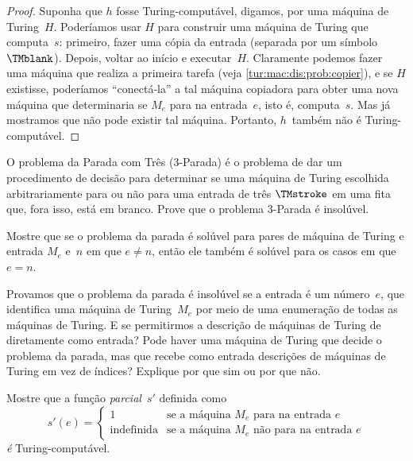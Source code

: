 \documentclass[../../../include/open-logic-section]{subfiles}
\begin{document}
\begin{proof}
Suponha que $h$ fosse Turing-computável, digamos, por uma máquina de
Turing~$H$. Poderíamos usar $H$ para construir uma máquina de Turing
que computa~$s$: primeiro, fazer uma cópia da entrada (separada por um
símbolo~$\TMblank$). Depois, voltar ao início e executar~$H$.
Claramente podemos fazer uma máquina que realiza a primeira tarefa
(veja \cref{tur:mac:dis:prob:copier}), e se $H$ existisse, poderíamos
``conectá-la'' a tal máquina copiadora para obter uma nova máquina que
determinaria se $M_e$ para na entrada~$e$, isto é, computa~$s$. Mas já
mostramos que não pode existir tal máquina. Portanto, $h$~também não é
Turing-computável.
\end{proof}

\begin{prob}
O problema da Parada com Três (3-Parada) é o problema de dar um
procedimento de decisão para determinar se uma máquina de Turing
escolhida arbitrariamente para ou não para uma entrada de três
$\TMstroke$ em uma fita que, fora isso, está em branco. Prove que o
problema 3-Parada é insolúvel.
\end{prob}

\begin{prob}
Mostre que se o problema da parada é solúvel para pares de máquina de
Turing e entrada $M_e$ e~$n$ em que $e \neq n$, então ele também é
solúvel para os casos em que $e = n$.
\end{prob}

\begin{prob}
Provamos que o problema da parada é insolúvel se a entrada é um
número~$e$, que identifica uma máquina de Turing~$M_e$ por meio de uma
enumeração de todas as máquinas de Turing. E se permitirmos a
descrição de máquinas de Turing de 
diretamente como entrada? Pode haver uma máquina de Turing que decide
o problema da parada, mas que recebe como entrada descrições de
máquinas de Turing em vez de índices? Explique por que sim ou por que
não.
\end{prob}

\begin{prob} Mostre que a função \emph{parcial}~$s'$ definida como
  \[
  s'(e) =
  \begin{cases}
    \text{1} & \text{se a máquina~$M_e$ para na entrada $e$}\\
    \text{indefinida} & \text{se a máquina~$M_e$ não para na entrada $e$}
  \end{cases}
  \]
  \emph{é} Turing-computável.
\end{prob}
\end{document}
